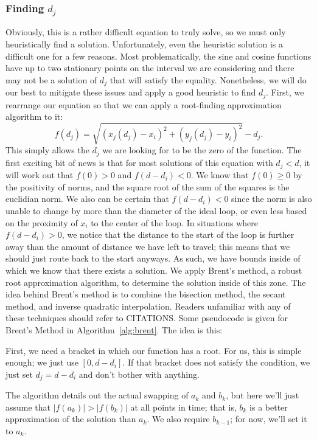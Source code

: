 \documentclass[twocolumn,11pt]{article}
\begin{document}
\subsubsection{Finding $d_j$}
Obviously, this is a rather difficult equation to truly solve, so we must only
heuristically find a solution. Unfortunately, even the heuristic solution is
a difficult one for a few reasons. Most problematically, the sine and cosine
functions have up to two stationary points on the interval we are considering
and there may not be a solution of $d_j$ that will satisfy the equality.
Nonetheless, we will do our best to mitigate these issues and apply a good
heuristic to find $d_j$. First, we rearrange our equation so that we can apply
a root-finding approximation algorithm to it:
\[ f(d_j) = \sqrt{(x_j(d_j) - x_i)^2 + (y_j(d_j) - y_i)^2} - d_j. \]
This simply allows the $d_j$ we are looking for to be the zero of the function.
The first exciting bit of news is that for most solutions of this equation with
$d_j < d$, it will work out that $f(0) > 0$ and $f(d-d_i) < 0$.
We know that $f(0) \geq 0$ by the
positivity of norms, and the square root of the sum of the squares is the
euclidian norm. We also can be certain that $f(d-d_i) < 0$ since
the norm is also unable to change by more than the diameter
of the ideal loop, or even less based on the proximity of $x_i$ to the center of
the loop. In situations where $f(d-d_i) > 0$, we notice that the distance to the
start of the loop is further away than the amount of distance we have left to
travel; this means that we should just route back to the start anyways. As such,
we have bounds inside of which we know that there exists a solution. We apply
Brent's method, a robust root approximation algorithm, to determine the solution
inside of this zone. The idea behind Brent's method is to combine the bisection
method, the secant method, and inverse quadratic interpolation. Readers
unfamiliar with any of these techniques should refer to CITATIONS. Some
pseudocode is given for Brent's Method in Algorithm~\ref{alg:brent}. The idea
is this:

First, we need a bracket in which our function has a root. For us, this is
simple enough; we just use $[0, d-d_i]$. If that bracket does not satisfy the
condition, we just set $d_j = d-d_i$ and don't bother with anything.

The algorithm details out the actual swapping of $a_k$ and $b_k$, but here
we'll just assume that $|f(a_k)| > |f(b_k)|$ at all points in time; that is,
$b_k$ is a better approximation of the solution than $a_k$. We also require
$b_{k-1}$; for now, we'll set it to $a_k$.
\end{document}
